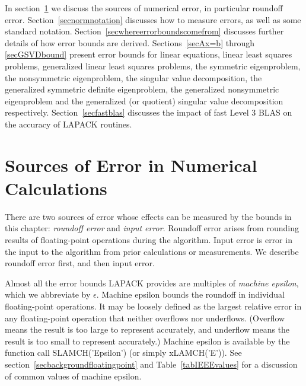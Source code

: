In section~\ref{secroundoff}
we discuss the sources of numerical error, in particular roundoff
error.
Section~\ref{secnormnotation} discusses how to measure errors,
as well as some standard notation.
Section~\ref{secwhereerrorboundscomefrom} discusses further details
of how error bounds are derived.
Sections~\ref{secAx=b} through \ref{secGSVDbound} present error bounds
for linear equations, linear least squares problems,
generalized linear least squares problems,
the symmetric eigenproblem,
the nonsymmetric eigenproblem,
the singular value decomposition,
the generalized symmetric definite eigenproblem,
the generalized nonsymmetric eigenproblem
and the
generalized (or quotient) singular value decomposition respectively.
Section~\ref{secfastblas} discusses the impact of fast
Level 3 BLAS on
the accuracy of LAPACK routines.


\section{Sources of Error in Numerical Calculations}\label{secroundoff}

There are two sources of error whose effects can be measured by the bounds in
this chapter: {\em roundoff error} and {\em input error}. Roundoff error
arises from rounding results of floating-point operations during
the algorithm.
Input error is error in the input to the algorithm from prior calculations or
measurements.  We describe roundoff error first, and then input error.

Almost all the error bounds LAPACK provides are multiples of
{\em machine epsilon},
which we abbreviate
by $\epsilon$. Machine epsilon bounds the roundoff in individual
floating-point operations.
It may be loosely defined as the largest relative error
in any floating-point operation that neither overflows nor underflows.
(Overflow means the result is too
large to represent accurately, and underflow means the result is too
small to represent accurately.) Machine epsilon is available by
the function call
SLAMCH('Epsilon') (or simply xLAMCH('E')).
See section~\ref{secbackgroundfloatingpoint} and
Table~\ref{tabIEEEvalues} for a discussion of common values of machine
epsilon.


